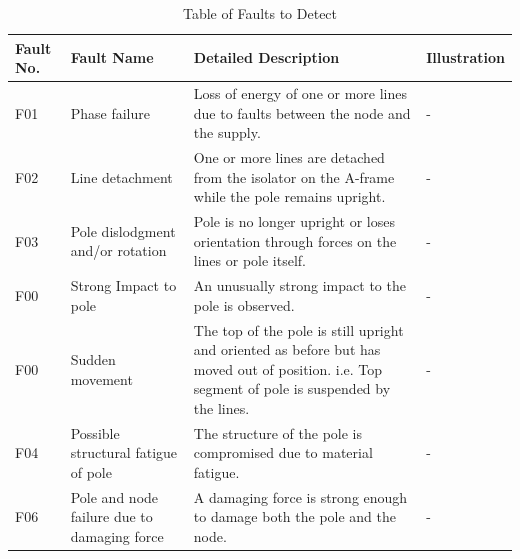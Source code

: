 \documentclass[12pt]{article}
\begin{document}
\begin{center}
  \begin{table}[htp!]
    \caption{Table of Faults to Detect}
    
    \hskip-1.2cm\begin{tabular}{|p{2cm}|p{4cm}|p{8cm}|p{4cm}|}
        \hline
        \textbf{Fault No.} & \textbf{Fault Name} & \textbf{Detailed Description} & \textbf{Illustration} \\
        \hline
        F01 & Phase failure & Loss  of  energy  of  one  or  more  lines  due  to  faults
        between the node and the supply. & - \\\hline

        F02 & Line detachment & One or more lines are detached from the isolator on the A-frame while the pole remains
        upright. & - \\\hline

        F03 & Pole dislodgment and/or rotation & Pole is no longer upright or loses orientation through forces on the
        lines or pole itself. & - \\\hline

        F00 & Strong Impact to pole & An unusually strong impact to the pole is observed. & - \\\hline

        F00 & Sudden movement & The top of the pole is still upright and oriented as before but has moved out of
        position. i.e. Top segment of pole is suspended by the lines. & - \\\hline
        F04 & Possible structural fatigue of pole & The structure of the pole is compromised due to material fatigue. & - \\\hline

        F06 & Pole and node failure due to damaging force & A damaging force is strong enough to damage both the pole
        and the node. & - \\\hline
  
    \end{tabular}    
  
  \label{tab:faults}
  \end{table}
\end{center}
\end{document}
